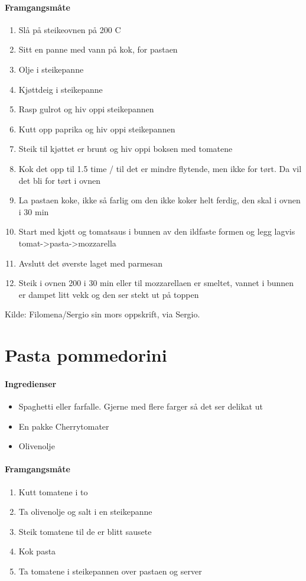 \documentclass[12pt,a4paper]{book}
\begin{document}
\paragraph{Framgangsmåte}
\begin{enumerate}[noitemsep]
	\item Slå på steikeovnen på 200 \degree C
	\item Sitt en panne med vann på kok, for pastaen
	\item Olje i steikepanne
	\item Kjøttdeig i steikepanne
	\item Rasp gulrot og hiv oppi steikepannen
	\item Kutt opp paprika og hiv oppi steikepannen
	\item Steik til kjøttet er brunt og hiv oppi boksen med tomatene
	\item Kok det opp til 1.5 time / til det er mindre flytende, men ikke for tørt. Da vil det bli for tørt i ovnen
	\item La pastaen koke, ikke så farlig om den ikke koker helt ferdig, den skal i ovnen i 30 min
	\item Start med kjøtt og tomatsaus i bunnen av den ildfaste formen og legg lagvis tomat->pasta->mozzarella
	\item Avslutt det øverste laget med parmesan
	\item Steik i ovnen 200 i 30 min eller til mozzarellaen er smeltet, vannet i bunnen er dampet litt vekk og den ser stekt ut på toppen
\end{enumerate}


Kilde: Filomena/Sergio sin mors oppskrift, via Sergio.
\clearpage{}
\clearpage{}\section{﻿Pasta pommedorini}

\paragraph{Ingredienser}
\begin{itemize}[noitemsep]
	\item Spaghetti eller farfalle. Gjerne med flere farger så det ser delikat ut
	\item En pakke Cherrytomater
	\item Olivenolje
\end{itemize}

\paragraph{Framgangsmåte}
\begin{enumerate}[noitemsep]
	\item Kutt tomatene i to
	\item Ta olivenolje og salt i en steikepanne
	\item Steik tomatene til de er blitt sausete
	\item Kok pasta
	\item Ta tomatene i steikepannen over pastaen og server
\end{enumerate}
\end{document}
